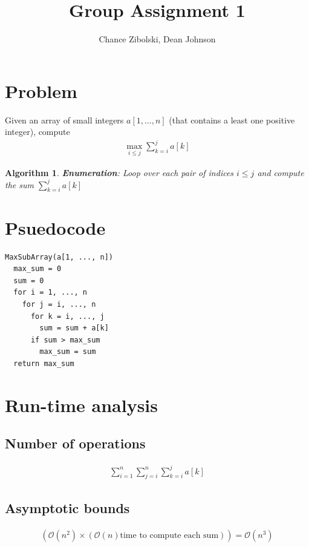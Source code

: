 \documentclass{article}
\title{Group Assignment 1}
\author{Chance Zibolski, Dean Johnson}
\newtheorem{algorithm}{Algorithm}
\begin{document}
\maketitle

\section*{Problem}
Given an array of small integers $a[1,\ldots,n]$ (that contains a least one
positive integer), compute
\begin{eqnarray*}
  \label{MaxSubArray}
  \max_{i \leq j}\sum_{k=i}^{j}a[k]
\end{eqnarray*}


\begin{algorithm}
\textbf{Enumeration}: Loop over each pair of indices $ i \leq j $ and
compute the sum $\sum_{k=i}^{j}a[k]$
\end{algorithm}

\section*{Psuedocode}

\begin{verbatim}
MaxSubArray(a[1, ..., n])
  max_sum = 0
  sum = 0
  for i = 1, ..., n
    for j = i, ..., n
      for k = i, ..., j
        sum = sum + a[k]
      if sum > max_sum
        max_sum = sum
  return max_sum
\end{verbatim}

\section*{Run-time analysis}

\subsection*{Number of operations}
\begin{eqnarray*}
  \sum_{i=1}^{n}\sum_{j=i}^{n}\sum_{k=i}^{j}a[k]
\end{eqnarray*}

\subsection*{Asymptotic bounds}
\begin{eqnarray*}
    (\mathcal{O}(n^2) \times (\mathcal{O}(n) \text{time to compute each sum})) = \mathcal{O}(n^3)
\end{eqnarray*}
\end{document}
